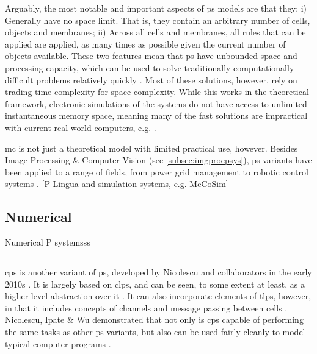 Arguably, the most notable and important aspects of \gls{ps} models are that they:  i) Generally have no space limit.  That is, they contain an arbitrary number of cells, objects and membranes;  ii) Across all cells and membranes, all rules that can be applied are applied, as many times as possible given the current number of objects available.  These two features mean that \gls{ps} have unbounded space and processing capacity, which can be used to solve traditionally computationally-difficult problems relatively quickly \cite{Sosik2003,Jimenez2003,Paun1999a,Henderson2020}.  Most of these solutions, however, rely on trading time complexity for space complexity.  While this works in the theoretical framework, electronic simulations of the systems do not have access to unlimited instantaneous memory space, meaning many of the fast solutions are impractical with current real-world computers, e.g. \cite{Cooper2019} \fxnote[inline]{[refs]}.

\Gls{mc} is not just a theoretical model with limited practical use, however.  Besides Image Processing \& Computer Vision (see \autoref{subsec:imgprocpsys}), \gls{ps} variants have been applied to a range of fields, from power grid management to robotic control systems \cite{Zhang2017}.  [P-Lingua and simulation systems, e.g. MeCoSim]

\subsection{\label{subsec:numpsys}Numerical }
Numerical P systemsss

\subsection{\label{subsec:cpsys}}

\gls{cps} is another variant of \gls{ps}, developed by Nicolescu and collaborators in the early 2010s \fxerror[inline]{[ref]}.  It is largely based on \gls{clps}, and can be seen, to some extent at least, as a higher-level abstraction over it \cite{Nicolescu2018}.  It can also incorporate elements of \gls{tlps}, however, in that it includes concepts of channels and message passing between cells \cite{Henderson2019}.  Nicolescu, Ipate \& Wu demonstrated that not only is \gls{cps} capable of performing the same tasks as other \gls{ps} variants, but also can be used fairly cleanly to model typical computer programs \cite{Nicolescu2014a}.

